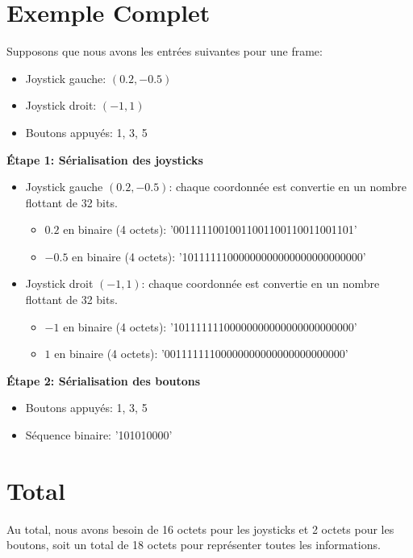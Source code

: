\documentclass{article}
\begin{document}
\section*{Exemple Complet}

Supposons que nous avons les entrées suivantes pour une frame:
\begin{itemize}
  \item Joystick gauche: $(0.2, -0.5)$
  \item Joystick droit: $(-1, 1)$
  \item Boutons appuyés: 1, 3, 5
\end{itemize}

\textbf{Étape 1: Sérialisation des joysticks}
\begin{itemize}
  \item Joystick gauche $(0.2, -0.5)$: chaque coordonnée est convertie en un nombre flottant de 32 bits.
    \begin{itemize}
      \item $0.2$ en binaire (4 octets): '00111110010011001100110011001101'
      \item $-0.5$ en binaire (4 octets): '10111111000000000000000000000000'
    \end{itemize}
  \item Joystick droit $(-1, 1)$: chaque coordonnée est convertie en un nombre flottant de 32 bits.
    \begin{itemize}
      \item $-1$ en binaire (4 octets): '10111111100000000000000000000000'
      \item $1$ en binaire (4 octets): '00111111100000000000000000000000'
    \end{itemize}
\end{itemize}

\textbf{Étape 2: Sérialisation des boutons}
\begin{itemize}
  \item Boutons appuyés: 1, 3, 5
  \item Séquence binaire: '101010000'
\end{itemize}

\section*{Total}

Au total, nous avons besoin de 16 octets pour les joysticks et 2 octets pour les boutons, soit un total de 18 octets pour représenter toutes les informations.
\end{document}
